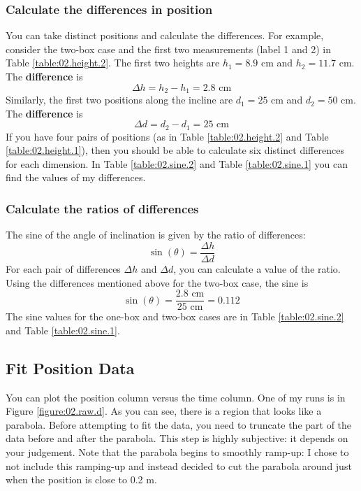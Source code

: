 \subsubsection{Calculate the differences in position}
You can take distinct positions and calculate the differences. For example, consider the two-box case and the first two measurements (label 1 and 2) in Table \ref{table:02.height.2}. The first two heights are $h_{1} = 8.9$ cm and $h_{2} = 11.7$ cm. The \textbf{difference} is
\begin{equation}
    \Delta h = h_{2} - h_{1} = 2.8 \text{ cm}
\end{equation}
Similarly, the first two positions along the incline are $d_{1} = 25$ cm and $d_{2} = 50$ cm. The \textbf{difference} is
\begin{equation}
    \Delta d = d_{2} - d_{1} = 25 \text{ cm}
\end{equation}
If you have four pairs of positions (as in Table \ref{table:02.height.2} and Table \ref{table:02.height.1}), then you should be able to calculate six distinct differences for each dimension. In Table \ref{table:02.sine.2} and Table \ref{table:02.sine.1} you can find the values of my differences.
\subsubsection{Calculate the ratios of differences}
The sine of the angle of inclination is given by the ratio of differences:
\begin{equation}
    \sin(\theta) = \frac{\Delta h}{\Delta d}
\end{equation}
For each pair of differences $\Delta h$ and $\Delta d$, you can calculate a value of the ratio. Using the differences mentioned above for the two-box case, the sine is
\begin{equation}
    \sin(\theta) = \frac{2.8 \text{ cm}}{25 \text{ cm}} = 0.112
\end{equation}
The sine values for the one-box and two-box cases are in Table \ref{table:02.sine.2} and Table \ref{table:02.sine.1}.
\subsection{Fit Position Data}
You can plot the position column versus the time column. One of my runs is in Figure \ref{figure:02.raw.d}. As you can see, there is a region that looks like a parabola. Before attempting to fit the data, you need to truncate the part of the data before and after the parabola. This step is highly subjective: it depends on your judgement. Note that the parabola begins to smoothly ramp-up: I chose to not include this ramping-up and instead decided to cut the parabola around just when the position is close to 0.2 m.

